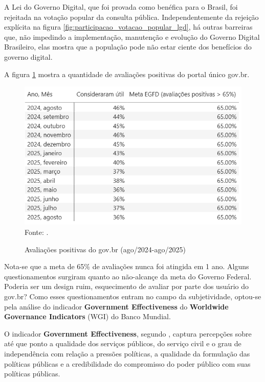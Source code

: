 A Lei do Governo Digital, que foi provada como benéfica para o Brasil, foi rejeitada na votação popular da consulta pública. Independentemente da rejeição explícita na figura \ref{fig:participacao_votacao_popular_lgd}, há outras barreiras que, não impedindo a implementação, manutenção e evolução do Governo Digital Brasileiro, elas mostra que a população pode não estar ciente dos benefícios do governo digital.
	
A figura \ref{fig:avaliacoes_poitivas_govbr} mostra a quantidade de avaliações positivas do portal único gov.br.
	
\begin{figure}[H]
	\centering
	\caption{Avaliações positivas do gov.br (ago/2024-ago/2025)}
	\includegraphics[width=1\linewidth]{figuras/avaliacoes_poitivas_govbr}
	\label{fig:avaliacoes_poitivas_govbr}
	\footnotesize{Fonte: \cite{painel_completo_monitoramento_govbr}.}
\end{figure}

Nota-se que a meta de 65\% de avaliações nunca foi atingida em 1 ano. Alguns questionamentos surgiram quanto ao não-alcançe da meta do Governo Federal. Poderia ser um design ruim, esquecimento de avaliar por parte dos usuário do gov.br? Como esses questionamentos entram no campo da subjetividade, optou-se pela análise do indicador \textbf{Government Effectiveness} do \textbf{Worldwide Governance Indicators} (WGI) do Banco Mundial.

O indicador \textbf{Government Effectiveness}, segundo \cite{kaufmann2024worldwide}, captura percepções sobre até que ponto a qualidade dos serviços públicos, do serviço civil e o grau de independência com relação a pressões políticas, a qualidade da formulação das políticas públicas e a credibilidade do compromisso do poder público com suas políticas públicas.


